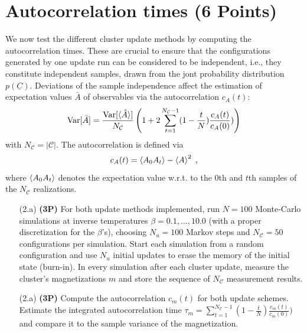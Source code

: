\documentclass[a4paper, 12pt]{article}
\begin{document}
%
\section{Autocorrelation times \textbf{(6 Points)}}
%
We now test the different cluster update methods by computing the autocorrelation times.
%
These are crucial to ensure that the configurations generated by one update run can be considered to be independent, i.e., they constitute independent samples, drawn from the jont probability distribution $p(\underline C)$.
%
Deviations of the sample independence affect the estimation of expectation values $\bar A$ of observables via the autocorrelation $c_A(t)$:
\begin{equation}
	\operatorname{Var}[\bar A] = \frac{\operatorname{Var}[\braket{\hat A}]}{N_\mathcal{C}} \left(1 + 2\sum_{t=1}^{N_\mathcal{C}-1}(1-\frac{t}{N})\frac{c_A(t)}{c_A(0)})\right)
\end{equation}
with $N_\mathcal{C} = \lvert \mathcal C \rvert$.
%
The autocorrelation is defined via
\begin{equation}
	c_A(t) = \braket{A_0 A_t} - \braket{A}^2 \;,
\end{equation}
where $\braket{A_0 A_t}$ denotes the expectation value w.r.t. to the $0$th and $t$th samples of the $N_\mathcal{C}$ realizations.
%
\begin{itemize}
	\item[(2.a)] \textbf{(3P)}
	For both update methods implemented, run $N=100$ Monte-Carlo simulations at inverse temperatures $\beta=0.1,\ldots,10.0$ (with a proper discretization for the $\beta$'s), choosing $N_u=100$ Markov steps and $N_\mathcal{C}=50$ configurations per simulation.
	Start each simulation from a random configuration and use $N_u$ initial updates to erase the memory of the initial state (burn-in).
	In every simulation after each cluster update, measure the cluster's magnetizations $m$ and store the sequence of $N_\mathcal{C}$ measurement results.
	\item[(2.a)] \textbf{(3P)}
	Compute the autocorrelation $c_m(t)$ for both update schemes.
	Estimate the integrated autocorrelation time $\tau_m = \sum_{t=1}^{N_\mathcal{C}-1}(1-\frac{t}{N})\frac{c_m(t)}{c_m(0)})$ and compare it to the sample variance of the magnetization.
\end{itemize}
%
\batchmode  %
\end{document}
